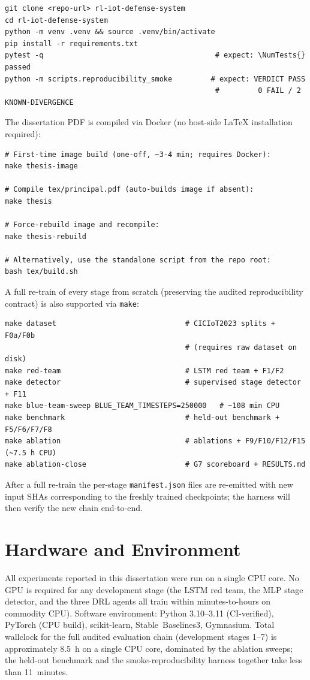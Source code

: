 \begin{verbatim}
git clone <repo-url> rl-iot-defense-system
cd rl-iot-defense-system
python -m venv .venv && source .venv/bin/activate
pip install -r requirements.txt
pytest -q                                        # expect: \NumTests{} passed
python -m scripts.reproducibility_smoke         # expect: VERDICT PASS
                                                 #         0 FAIL / 2 KNOWN-DIVERGENCE
\end{verbatim}

The dissertation PDF is compiled via Docker (no host-side \LaTeX{} installation required):

\begin{verbatim}
# First-time image build (one-off, ~3-4 min; requires Docker):
make thesis-image

# Compile tex/principal.pdf (auto-builds image if absent):
make thesis

# Force-rebuild image and recompile:
make thesis-rebuild

# Alternatively, use the standalone script from the repo root:
bash tex/build.sh
\end{verbatim}

A full re-train of every stage from scratch (preserving the audited reproducibility contract) is also supported via \texttt{make}:

\begin{verbatim}
make dataset                              # CICIoT2023 splits + F0a/F0b
                                          # (requires raw dataset on disk)
make red-team                             # LSTM red team + F1/F2
make detector                             # supervised stage detector + F11
make blue-team-sweep BLUE_TEAM_TIMESTEPS=250000   # ~108 min CPU
make benchmark                            # held-out benchmark + F5/F6/F7/F8
make ablation                             # ablations + F9/F10/F12/F15 (~7.5 h CPU)
make ablation-close                       # G7 scoreboard + RESULTS.md
\end{verbatim}

After a full re-train the per-stage \texttt{manifest.json} files are re-emitted with new input SHAs corresponding to the freshly trained checkpoints; the harness will then verify the new chain end-to-end.

\section{Hardware and Environment}\label{app:hardware}
All experiments reported in this dissertation were run on a single CPU core. No GPU is required for any development stage (the LSTM red team, the MLP stage detector, and the three DRL agents all train within minutes-to-hours on commodity CPU). Software environment: Python 3.10--3.11 (CI-verified), PyTorch (CPU build), scikit-learn, Stable~Baselines3, Gymnasium. Total wallclock for the full audited evaluation chain (development stages 1--7) is approximately 8.5~h on a single CPU core, dominated by the ablation sweeps; the held-out benchmark and the smoke-reproducibility harness together take less than 11~minutes.

